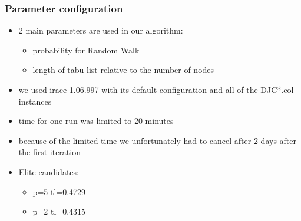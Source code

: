 \documentclass{beamer}
\begin{document}
\begin{frame}
    \frametitle{Parameter configuration}
    \begin{itemize}
    \item 2 main parameters are used in our algorithm:
      \begin{itemize}
      \item probability for Random Walk
      \item length of tabu list relative to the number of nodes
      \end{itemize}

      
  \item we used irace 1.06.997 with its default configuration and all of the DJC*.col instances
  \item time for one run was limited to 20 minutes
  \item because of the limited time we unfortunately had to cancel after 2 days after the first iteration

  \item Elite candidates:
    \begin{itemize}
    \item p=5 tl=0.4729
    \item p=2 tl=0.4315

    \end{itemize}


    \end{itemize} 
  \end{frame}
\end{document}
